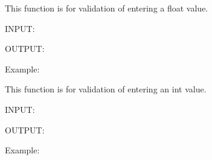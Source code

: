 \documentclass[letterpaper,10pt,english]{sphinxmanual}
\begin{document}
\begin{fulllineitems}
\label{\detokenize{Functions:lorenz.util.my_input_float}}
This function is for validation of entering a float value.

INPUT:

\begin{sphinxVerbatim}[commandchars=\\\{\}]
         
\end{sphinxVerbatim}

OUTPUT:

\begin{sphinxVerbatim}[commandchars=\\\{\}]
      
\end{sphinxVerbatim}

Example:

\begin{sphinxVerbatim}[commandchars=\\\{\}]
  
\end{sphinxVerbatim}

\end{fulllineitems}


\begin{fulllineitems}
\label{\detokenize{Functions:lorenz.util.my_input_int}}
This function is for validation of entering an int value.

INPUT:

\begin{sphinxVerbatim}[commandchars=\\\{\}]
         
\end{sphinxVerbatim}

OUTPUT:

\begin{sphinxVerbatim}[commandchars=\\\{\}]
      
\end{sphinxVerbatim}

Example:

\begin{sphinxVerbatim}[commandchars=\\\{\}]
  
\end{sphinxVerbatim}

\end{fulllineitems}
\end{document}
